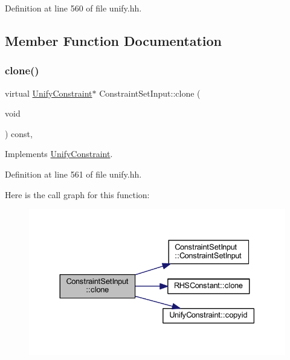 Definition at line 560 of file unify.\+hh.



\subsection{Member Function Documentation}
\mbox{\label{class_constraint_set_input_a354bb6ff80135e817248e1da6c14731f}} 
\subsubsection{\texorpdfstring{clone()}{clone()}}
{\footnotesize\ttfamily virtual \mbox{\hyperlink{class_unify_constraint}{Unify\+Constraint}}$\ast$ Constraint\+Set\+Input\+::clone (\begin{DoxyParamCaption}\item[{void}]{ }\end{DoxyParamCaption}) const\hspace{0.3cm}{\ttfamily [inline]}, {\ttfamily [virtual]}}



Implements \mbox{\hyperlink{class_unify_constraint_a4f068343932637d355644bb21559aa12}{Unify\+Constraint}}.



Definition at line 561 of file unify.\+hh.

Here is the call graph for this function\+:
\nopagebreak
\begin{figure}[H]
\begin{center}
\leavevmode
\includegraphics[width=330pt]{class_constraint_set_input_a354bb6ff80135e817248e1da6c14731f_cgraph}
\end{center}
\end{figure}
\mbox{\label{class_constraint_set_input_aa1a4f5a68db4e16baf4a84a76c6c4540}} 
